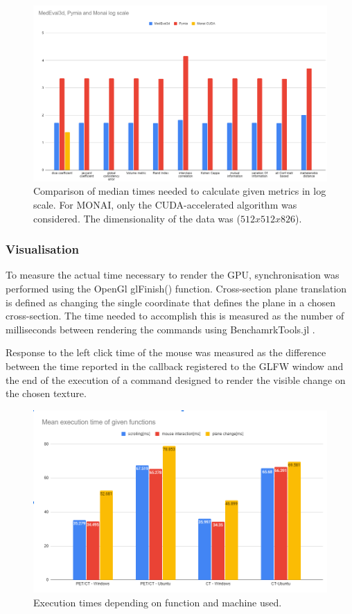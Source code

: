 \documentclass{juliacon}
\begin{document}
\begin{figure}[h!]
	\centering
	\includegraphics[width=\columnwidth]{bk.png}
	\caption{Comparison of median times needed to calculate given metrics in log scale. For MONAI, only the CUDA-accelerated algorithm was considered. The dimensionality of the data was ($ 512x512x826 $).  }
	\label{fig:bk}
\end{figure}

\subsubsection{Visualisation}

To measure the actual time necessary to  render the GPU, synchronisation was performed using the OpenGl glFinish() function.
Cross-section plane translation is defined as changing the single coordinate that defines the plane in a chosen cross-section. The time needed to accomplish this is measured as the number of milliseconds between rendering the commands using BenchamrkTools.jl \cite{BenchmarkTools}. 

Response to the left click time of the mouse was measured as the difference between the time reported in the callback registered to the GLFW window and the end of the execution of a command designed to render the visible change on the chosen texture.

\begin{figure}[t!]
	\centering
	\includegraphics[width=\columnwidth]{Przechwytywanie.png}
	\caption{Execution times depending on function and machine used.}
	\label{fig:Przechwytywanie}
	\centering
\end{figure}
\end{document}
